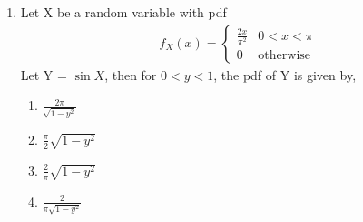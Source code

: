 \renewcommand{\theequation}{\theenumi}
\renewcommand{\thefigure}{\theenumi}
\renewcommand{\thetable}{\theenumi}
\begin{enumerate}[label=\thesection.\arabic*.,ref=\thesection.\theenumi]

\item Let X be a random variable with pdf
\begin{align}
    f_{X}(x)=\begin{cases} 
            \frac{2x}{\pi^2}  &  0<x<\pi\\
            0 & \text{otherwise}
            \end{cases} 
\end{align}
Let Y = $\sin{X}$, then for $0<y<1$, the pdf of Y is given by,
\begin{enumerate}[label = (\Alph*)]
    \item  $\frac{2\pi}{\sqrt{1-y^2}}$\\
    \item  $\frac{\pi}{2}\sqrt{1-y^2}$\\
    \item  $\frac{2}{\pi}\sqrt{1-y^2}$\\
    \item  $\frac{2}{\pi\sqrt{1-y^2}}$
\end{enumerate}
\solution


\end{enumerate}
